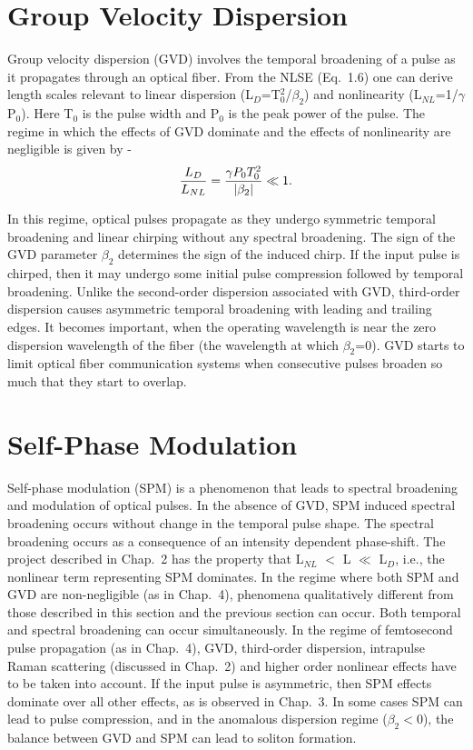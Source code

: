 \section{Group Velocity Dispersion}

Group velocity dispersion \cite{Agrawal3} (GVD) involves the temporal broadening of a pulse as it propagates through an optical fiber. From the NLSE (Eq.\ 1.6) one can derive length scales relevant to linear dispersion (L$_{D}$=T$_{0}^{2}$/$\beta_{2}$) and nonlinearity (L$_{NL}$=1/$\gamma$P$_{0}$). Here T$_{0}$ is the pulse width and P$_{0}$ is the peak power of the pulse. The regime in which the effects of GVD dominate and the effects of nonlinearity are negligible is given by -
\begin{equation}
{L_{D} \over L_{NL}}={\gamma P_{0} T_{0}^{2} \over |\beta_{2}|} \ll 1 .
\end{equation}

In this regime, optical pulses propagate as they undergo symmetric temporal broadening and linear chirping without any spectral broadening. The sign of the GVD parameter $\beta_{2}$ determines the sign of the induced chirp. If the input pulse is chirped, then it may undergo some initial pulse compression followed by temporal broadening. Unlike the second-order dispersion associated with GVD, third-order dispersion causes asymmetric temporal broadening with leading and trailing edges. It becomes important, when the operating wavelength is near the zero dispersion wavelength of the fiber (the wavelength at which $\beta_{2}$=0). GVD starts to limit optical fiber communication systems when consecutive pulses broaden so much that they start to overlap.   

\section{Self-Phase Modulation}

Self-phase modulation \cite{Agrawal4} (SPM) is a phenomenon that leads to spectral broadening and modulation of optical pulses. In the absence of GVD, SPM induced spectral broadening occurs without change in the temporal pulse shape. The spectral broadening occurs as a consequence of an intensity dependent phase-shift. The project described in Chap.\ 2 has the property that L$_{NL}$ $<$ L $\ll$ L$_D$, i.e., the nonlinear term representing SPM dominates. In the regime where both SPM and GVD are non-negligible (as in Chap.\ 4), phenomena qualitatively different from those described in this section and the previous section can occur. Both temporal and spectral broadening can occur simultaneously. In the regime of femtosecond pulse propagation (as in Chap.\ 4), GVD, third-order dispersion, intrapulse Raman scattering (discussed in Chap.\ 2) and higher order nonlinear effects have to be taken into account. If the input pulse is asymmetric, then SPM effects dominate over all other effects, as is observed in Chap.\ 3. In some cases SPM can lead to pulse compression, and in the anomalous dispersion regime ($\beta_2 < 0$), the balance between GVD and SPM can lead to soliton formation. 

